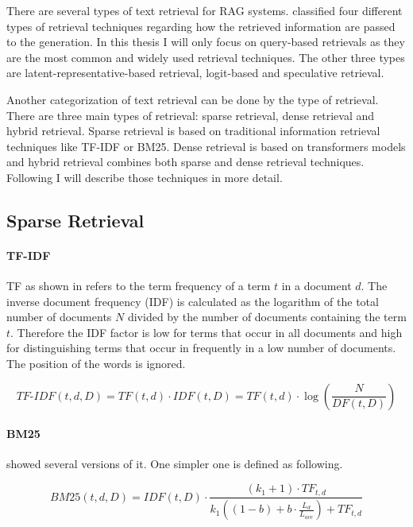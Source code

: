 
There are several types of text retrieval for RAG systems. \citet{Zhao.29.02.2024} classified four different types of retrieval techniques regarding how the retrieved information are passed to the generation. In this thesis I will only focus on query-based retrievals as they are the most common and widely used retrieval techniques. The other three types are latent-representative-based retrieval, logit-based and speculative retrieval.

Another categorization of text retrieval can be done by the type of retrieval. There are three main types of retrieval: sparse retrieval, dense retrieval and hybrid retrieval. Sparse retrieval is based on traditional information retrieval techniques like TF-IDF or BM25. Dense retrieval is based on transformers models and hybrid retrieval combines both sparse and dense retrieval techniques. Following I  will describe those techniques in more detail.
\subsection{Sparse Retrieval}
\label{sec:sparse_retrieval}

\paragraph{TF-IDF}
\label{sec:tfidf}

TF as shown in \citet{Manning.2009} refers to the term frequency of a term $t$ in a document $d$. The inverse document frequency (IDF) is calculated as the logarithm of the total number of documents $N$ divided by the number of documents containing the term $t$. Therefore the IDF factor is low for terms that occur in all documents and high for distinguishing terms that occur in frequently in a low number of documents. The position of the words is ignored.

$$\textit{TF-IDF}(t, d, D) = \textit{TF}(t, d) \cdot \textit{IDF}(t, D) = \textit{TF}(t, d) \cdot \log\left(\frac{N}{\textit{DF}(t, D)}\right)
$$

\paragraph{BM25}
\label{sec:bm25}

\citet{Manning.2009} showed several versions of it. One simpler one is defined as following.


$$BM25(t, d, D) = IDF(t, D) \cdot \frac{(k_1 + 1) \cdot TF_{t, d}}{k_1((1-b)+b \cdot \frac{L_d}{L_{ave}}) + TF_{t, d}}$$


